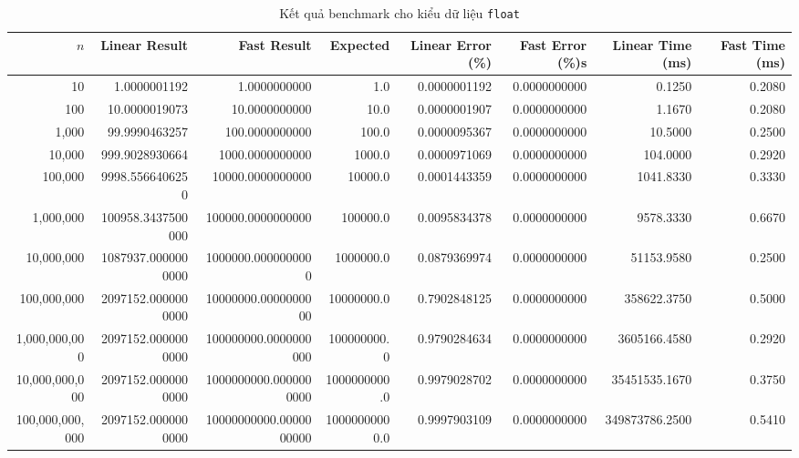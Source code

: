 \begin{landscape}
\begin{table}
    \centering
    \caption{Kết quả benchmark cho kiểu dữ liệu \texttt{float} }
    \small %
    \begin{tabular}{r r r r r r r r}
        \toprule
        $n$ & Linear Result & Fast Result & Expected & Linear Error (\%) & Fast Error (\%)s & Linear Time (ms) & Fast Time (ms) \\
        \midrule
        10 & 1.0000001192 & 1.0000000000 & 1.0 & 0.0000001192 & 0.0000000000 & 0.1250 & 0.2080 \\
        100 & 10.0000019073 & 10.0000000000 & 10.0 & 0.0000001907 & 0.0000000000 & 1.1670 & 0.2080 \\
        1,000 & 99.9990463257 & 100.0000000000 & 100.0 & 0.0000095367 & 0.0000000000 & 10.5000 & 0.2500 \\
        10,000 & 999.9028930664 & 1000.0000000000 & 1000.0 & 0.0000971069 & 0.0000000000 & 104.0000 & 0.2920 \\
        100,000 & 9998.5566406250 & 10000.0000000000 & 10000.0 & 0.0001443359 & 0.0000000000 & 1041.8330 & 0.3330 \\
        1,000,000 & 100958.3437500000 & 100000.0000000000 & 100000.0 & 0.0095834378 & 0.0000000000 & 9578.3330 & 0.6670 \\
        10,000,000 & 1087937.0000000000 & 1000000.0000000000 & 1000000.0 & 0.0879369974 & 0.0000000000 & 51153.9580 & 0.2500 \\
        100,000,000 & 2097152.0000000000 & 10000000.0000000000 & 10000000.0 & 0.7902848125 & 0.0000000000 & 358622.3750 & 0.5000 \\
        1,000,000,000 & 2097152.0000000000 & 100000000.0000000000 & 100000000.0 & 0.9790284634 & 0.0000000000 & 3605166.4580 & 0.2920 \\
        10,000,000,000 & 2097152.0000000000 & 1000000000.0000000000 & 1000000000.0 & 0.9979028702 & 0.0000000000 & 35451535.1670 & 0.3750 \\
        100,000,000,000 & 2097152.0000000000 & 10000000000.0000000000 & 10000000000.0 & 0.9997903109 & 0.0000000000 & 349873786.2500 & 0.5410 \\
        \bottomrule
    \end{tabular}
\end{table}


\end{landscape}
